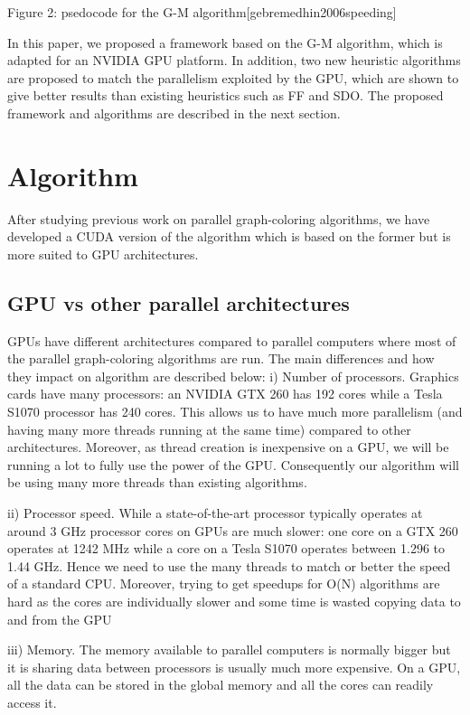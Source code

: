 \documentclass[preprint]{sigplanconf}
\begin{document}
Figure 2: psedocode for the G-M algorithm[gebremedhin2006speeding] \

In this paper, we proposed a framework based on the G-M algorithm, which is adapted for an  NVIDIA GPU platform.  In addition, two new heuristic algorithms are proposed to match the parallelism exploited by the GPU, which are shown to give better results than existing heuristics such as FF and SDO. The proposed framework and algorithms are described in the next section.

\section{Algorithm}

After studying previous work on parallel graph-coloring algorithms,  we have developed a CUDA version of the algorithm which is based on the former but is more suited to GPU architectures.

\subsection{GPU vs other parallel architectures}
GPUs have different architectures compared to parallel computers where most of the parallel graph-coloring algorithms are run. The main differences and how they impact on algorithm are described below:
i) Number of processors. Graphics cards have many processors: an NVIDIA GTX 260 has 192 cores while a Tesla S1070 processor has 240 cores. This allows us to have much more parallelism (and having many more threads running at the same time) compared to other architectures. Moreover, as thread creation is inexpensive on a GPU, we will be running a lot to fully use the power of the GPU. Consequently our algorithm will be using many more threads than existing algorithms.

ii) Processor speed. While a state-of-the-art processor typically operates at around 3 GHz processor cores on GPUs are much slower: one core on a GTX 260 operates at 1242 MHz while a core on a Tesla S1070 operates between 1.296 to 1.44  GHz. Hence we need to use the many threads to match or better the speed of a standard CPU. Moreover, trying to get speedups for  O(N) algorithms are hard as the cores are individually slower and some time is wasted copying data to and from the GPU

iii) Memory. The memory available to parallel computers is normally bigger but it is sharing data between processors is usually much more expensive. On a GPU, all the data can be stored in the global memory and all the cores can readily access it.
\end{document}
